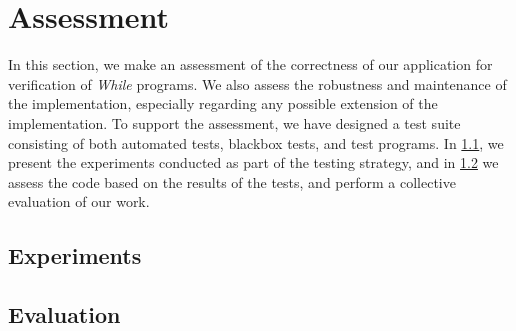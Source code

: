 \section{Assessment}\label{sec:assessment}
In this section, we make an assessment of the correctness of our application for verification of \textit{While} programs.
We also assess the robustness and maintenance of the implementation, especially regarding any possible extension of the implementation.
To support the assessment, we have designed a test suite consisting of both automated tests, blackbox tests, and test programs.
In \cref{sec:experiments}, we present the experiments conducted as part of the testing strategy, and in \cref{sec:evaluation} we assess the code based on the results of the tests, and perform a collective evaluation of our work.

\subsection{Experiments}\label{sec:experiments}


\subsection{Evaluation}\label{sec:evaluation}


